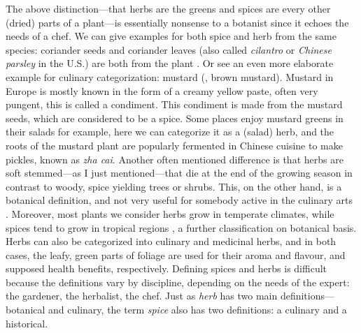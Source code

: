 The above distinction---that herbs are the greens and spices are every other (dried) parts of a plant---is essentially nonsense to a botanist since it echoes the needs of a chef. We can give examples for both spice and herb from the same species: coriander seeds and coriander leaves (also called \textit{cilantro} or \textit{Chinese parsley} in the U.S.) are both from the plant .
Or see an even more elaborate example for culinary categorization: mustard (, brown mustard). Mustard in Europe is mostly known in the form of a creamy yellow paste, often very pungent, this is called a condiment. This condiment is made from the mustard seeds, which are considered to be a spice. Some places enjoy mustard greens in their salads for example, here we can categorize it as a (salad) herb, and the roots of the mustard plant are popularly fermented in Chinese cuisine to make pickles, known as  \textit{zha cai}. Another often mentioned difference is that herbs are soft stemmed---as I just mentioned---that die at the end of the growing season in contrast to woody, spice yielding trees or shrubs. This, on the other hand, is a botanical definition, and not very useful for somebody active in the culinary arts \autocite[10]{allen_herbs_2012}. Moreover, most plants we consider herbs grow in temperate climates, while spices tend to grow in tropical regions \autocite{turner_spice_2004}, a further classification on botanical basis. Herbs can also be categorized into culinary and medicinal herbs, and in both cases, the leafy, green parts of foliage are used for their aroma and flavour, and supposed health benefits, respectively.
Defining spices and herbs is difficult because the definitions vary by discipline, depending on the needs of the expert: the gardener, the herbalist, the chef. Just as \textit{herb} has two main definitions---botanical and culinary, the term \textit{spice} also has two definitions: a culinary and a historical.

